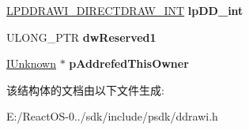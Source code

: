 \begin{DoxyCompactItemize}
\hyperlink{struct___d_d_r_a_w_i___d_i_r_e_c_t_d_r_a_w___i_n_t}{L\+P\+D\+D\+R\+A\+W\+I\+\_\+\+D\+I\+R\+E\+C\+T\+D\+R\+A\+W\+\_\+\+I\+NT} {\bfseries lp\+D\+D\+\_\+int}
\item 
\mbox{\label{struct___d_d_r_a_w_i___d_d_r_a_w_c_l_i_p_p_e_r___l_c_l_a057ec76bcf341857729d6d6a581e11e7}} 
U\+L\+O\+N\+G\+\_\+\+P\+TR {\bfseries dw\+Reserved1}
\item 
\mbox{\label{struct___d_d_r_a_w_i___d_d_r_a_w_c_l_i_p_p_e_r___l_c_l_a01eaeb65a78a9a9d65ffab195f81bdc9}} 
\hyperlink{interface_i_unknown}{I\+Unknown} $\ast$ {\bfseries p\+Addrefed\+This\+Owner}
\end{DoxyCompactItemize}


该结构体的文档由以下文件生成\+:\begin{DoxyCompactItemize}
\item 
E\+:/\+React\+O\+S-\/0../sdk/include/psdk/ddrawi.\+h\end{DoxyCompactItemize}
